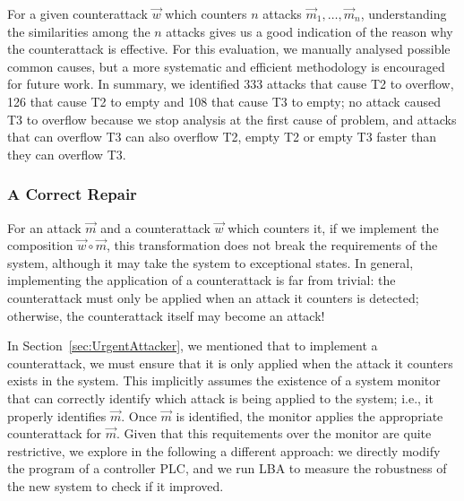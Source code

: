{For a given counterattack $\vec{w}$ which counters $n$ attacks $\vec{m}_1, \ldots, \vec{m}_n$, understanding the similarities among the $n$ attacks gives us a good indication of the reason why the counterattack is effective. For this evaluation, we manually analysed possible common causes, but a more systematic and efficient methodology is encouraged for future work. In summary, we identified 333 attacks that cause T2 to overflow, 126 that cause T2 to empty and 108 that cause T3 to empty; no attack caused T3 to overflow because we stop analysis at the first cause of problem, and attacks that can overflow T3 can also overflow T2, empty T2 or empty T3 faster than they can overflow T3.


\subsubsection{A Correct Repair}
\label{sec:CorrectRepair}
For an attack $\vec{m}$ and a counterattack $\vec{w}$ which counters it, if we implement the composition $\vec{w}\circ \vec{m}$, this transformation does not break the requirements of the system, although it may take the system to exceptional states. In general, implementing the application of a counterattack is far from trivial: the counterattack must only be applied when an attack it counters is detected; otherwise, the counterattack itself may become an attack! 

In Section~\ref{sec:UrgentAttacker}, we mentioned that to implement a counterattack, we must ensure that it is only applied when the attack it counters exists in the system. This implicitly assumes the existence of a system monitor that can correctly identify which attack is being applied to the system; i.e., it properly identifies $\vec{m}$. Once $\vec{m}$ is identified, the monitor applies the appropriate counterattack for $\vec{m}$. Given that this requitements over the monitor are quite restrictive, we explore in the following a different approach: we directly modify the program of a controller PLC, and we run LBA to measure the robustness of the new system to check if it improved. 

}

